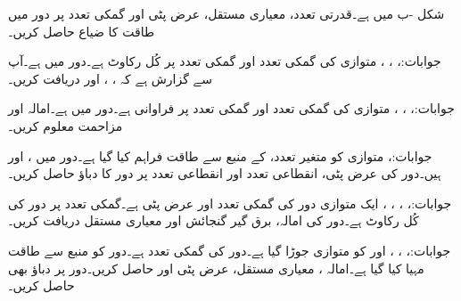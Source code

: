 شکل -ب میں  ہے۔قدرتی تعدد، معیاری مستقل، عرض پٹی اور گمکی تعدد پر دور میں طاقت کا ضیاع حاصل کریں۔

جوابات:، ، ، 
متوازی  کی گمکی تعدد  اور گمکی تعدد پر کُل رکاوٹ  ہے۔دور میں  ہے۔آپ سے گزارش ہے کہ ، ،  اور  دریافت کریں۔

جوابات:، ، ، 
متوازی  کی گمکی تعدد  اور گمکی تعدد پر فراوانی  ہے۔دور میں  ہے۔امالہ  اور مزاحمت  معلوم کریں۔

جوابات:، 
متوازی  کو متغیر تعدد،  کے منبع سے طاقت فراہم کیا گیا ہے۔دور میں ،  اور  ہیں۔دور کی عرض پٹی، انقطاعی تعدد  اور انقطاعی تعدد پر دور کا دباؤ حاصل کریں۔

جوابات:، ، ، ، 
ایک متوازی  دور کی گمکی تعدد  اور عرض پٹی  ہے۔گمکی تعدد پر دور کی کُل رکاوٹ  ہے۔دور کی امالہ، برق گیر گنجائش اور معیاری مستقل دریافت کریں۔

جوابات:، ، 
،  اور  کو متوازی جوڑا گیا ہے۔دور کی گمکی تعدد  ہے۔دور کو  منبع سے طاقت مہیا کیا گیا ہے۔امالہ ، معیاری مستقل، عرض پٹی  اور   حاصل کریں۔دور پر دباؤ  بھی حاصل کریں۔

